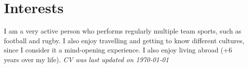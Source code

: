 \documentclass[hidelinks,letterpaper]{twentysecondcv} %
\begin{document}

\section{Interests}

\small{I am a very active person who performs regularly multiple team sports, such as football and rugby. I also enjoy travelling and getting to know different cultures, since I consider it a mind-opening experience. I also enjoy living abroad (+6 years over my life).}
\vfill
\flushright\textit{CV was last updated on \today}
\end{document}
